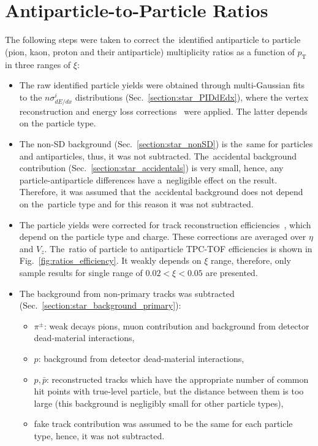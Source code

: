 \section{Antiparticle-to-Particle Ratios}\label{section:star_ratios}
The following steps were taken to correct the~identified antiparticle to particle (pion, kaon, proton and their antiparticle) multiplicity ratios as a function of $p_\textrm{T}$ in three ranges of $\xi$:
\begin{itemize}
	\item The raw identified particle yields were obtained through multi-Gaussian fits to the $n\sigma^i_{dE/dx}$ distributions (Sec.~\ref{section:star_PIDdEdx}), where the vertex reconstruction and energy loss corrections~\cite{supplementaryNote} were applied. The latter depends on the particle type.
	\item 	The non-SD background (Sec.~\ref{section:star_nonSD}) is the~same for particles and  antiparticles, thus, it was not subtracted.
	The~accidental background contribution (Sec.~\ref{section:star_accidentals})  is very small, hence, any particle-antiparticle differences have a~negligible effect on the result. Therefore, 
	it was assumed that the~accidental background does not depend on the~particle type and for this reason it was not subtracted. 
	\item The particle yields were corrected for track reconstruction efficiencies~\cite{supplementaryNote}, which depend on the particle type and charge. These corrections are averaged over $\eta$ and $V_{z}$. The~ratio of particle to antiparticle TPC-TOF efficiencies is shown in Fig.~\ref{fig:ratios_efficiency}.  It weakly depends on $\xi$ range, therefore, only sample results for single range of $0.02<\xi<0.05$  are presented.
	\item The background from non-primary tracks was subtracted (Sec.~\ref{section:star_background_primary}):
	\begin{itemize}
		\item $\pi^\pm$: weak decays pions, muon contribution and background from  detector dead-material interactions,
		\item $p$: background from  detector dead-material interactions,
		\item $p,\bar{p}$: reconstructed tracks which have the appropriate number of common hit points with true-level particle, but the distance between them is too large (this background is negligibly small for other particle types),
		\item fake track contribution was assumed to be the same for each particle type, hence, it was not subtracted. 

\end{itemize}
\end{itemize}
